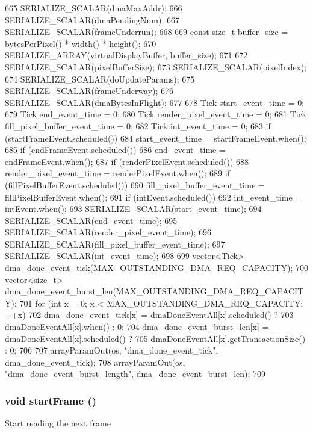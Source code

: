 \begin{DoxyCode}
{665     SERIALIZE_SCALAR(dmaMaxAddr);
666     SERIALIZE_SCALAR(dmaPendingNum);
667     SERIALIZE_SCALAR(frameUnderrun);
668 
669     const size_t buffer_size = bytesPerPixel() * width() * height();
670     SERIALIZE_ARRAY(virtualDisplayBuffer, buffer_size);
671 
672     SERIALIZE_SCALAR(pixelBufferSize);
673     SERIALIZE_SCALAR(pixelIndex);
674     SERIALIZE_SCALAR(doUpdateParams);
675     SERIALIZE_SCALAR(frameUnderway);
676     SERIALIZE_SCALAR(dmaBytesInFlight);
677 
678     Tick start_event_time = 0;
679     Tick end_event_time = 0;
680     Tick render_pixel_event_time = 0;
681     Tick fill_pixel_buffer_event_time = 0;
682     Tick int_event_time = 0;
683     if (startFrameEvent.scheduled())
684         start_event_time = startFrameEvent.when();
685     if (endFrameEvent.scheduled())
686         end_event_time = endFrameEvent.when();
687     if (renderPixelEvent.scheduled())
688         render_pixel_event_time = renderPixelEvent.when();
689     if (fillPixelBufferEvent.scheduled())
690         fill_pixel_buffer_event_time = fillPixelBufferEvent.when();
691     if (intEvent.scheduled())
692         int_event_time = intEvent.when();
693     SERIALIZE_SCALAR(start_event_time);
694     SERIALIZE_SCALAR(end_event_time);
695     SERIALIZE_SCALAR(render_pixel_event_time);
696     SERIALIZE_SCALAR(fill_pixel_buffer_event_time);
697     SERIALIZE_SCALAR(int_event_time);
698 
699     vector<Tick> dma_done_event_tick(MAX_OUTSTANDING_DMA_REQ_CAPACITY);
700     vector<size_t> dma_done_event_burst_len(MAX_OUTSTANDING_DMA_REQ_CAPACITY);
701     for (int x = 0; x < MAX_OUTSTANDING_DMA_REQ_CAPACITY; ++x) {
702         dma_done_event_tick[x] = dmaDoneEventAll[x].scheduled() ?
703             dmaDoneEventAll[x].when() : 0;
704         dma_done_event_burst_len[x] = dmaDoneEventAll[x].scheduled() ?
705             dmaDoneEventAll[x].getTransactionSize() : 0;
706     }
707     arrayParamOut(os, "dma_done_event_tick", dma_done_event_tick);
708     arrayParamOut(os, "dma_done_event_burst_length", dma_done_event_burst_len);
709 }
\end{DoxyCode}
\hypertarget{classHDLcd_a24932aa8063bd34ee82a44b55990fc56}{
\subsubsection[{startFrame}]{\setlength{\rightskip}{0pt plus 5cm}void startFrame ()}}
\label{classHDLcd_a24932aa8063bd34ee82a44b55990fc56}
Start reading the next frame 


